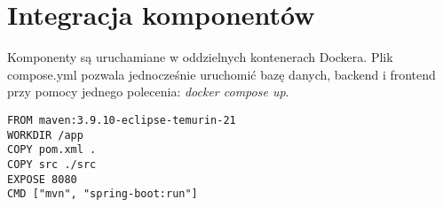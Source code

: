 \section{Integracja komponentów}
Komponenty są uruchamiane w oddzielnych kontenerach Dockera. Plik compose.yml pozwala jednocześnie uruchomić bazę danych, backend i frontend przy pomocy jednego polecenia: \textit{docker compose up}.
\begin{lstlisting}[caption={Budowanie obrazu - Dockerfile}, label={lst:Docker-build}]
FROM maven:3.9.10-eclipse-temurin-21
WORKDIR /app
COPY pom.xml .
COPY src ./src
EXPOSE 8080
CMD ["mvn", "spring-boot:run"]
\end{lstlisting}